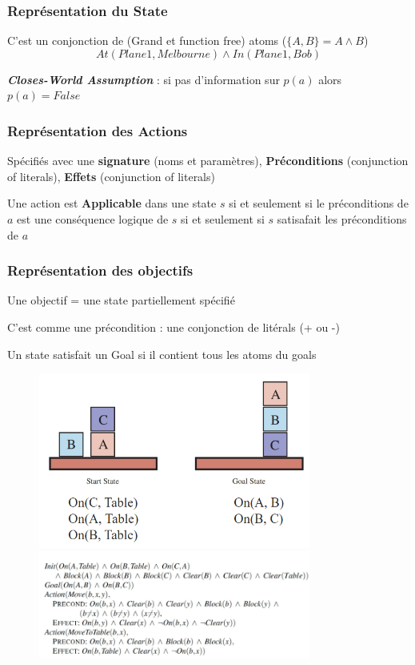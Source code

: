 \documentclass[12pt]{article}
\begin{document}
		\subsubsection{Représentation du State}
			C'est un conjonction de (Grand et function free) atoms ($\{A,B\} = A\land B$)
			\begin{equation}
				At(Plane1, Melbourne) \land In(Plane1, Bob)
			\end{equation}
			
			\textbf{\textit{Closes-World Assumption}} : si pas d'information sur $p(a)$ alors $p(a) = False$
			
		\subsubsection{Représentation des Actions}
			Spécifiés avec une \textbf{signature} (noms et paramètres), \textbf{Préconditions} (conjunction of literals), \textbf{Effets} (conjunction of literals)
			
			Une action est \textbf{Applicable} dans une state $s$ si et seulement si le préconditions de $a$ est une conséquence logique de $s$ si et seulement si $s$ satisafait les préconditions de $a$
			
		\subsubsection{Représentation des objectifs}
			Une objectif = une state partiellement spécifié
			
			C'est comme une précondition : une conjonction de litérals (+ ou -)
			
			Un state satisfait un Goal si il contient tous les atoms du goals
		
			
			\begin{figure}[htp]	
				\centering
				\includegraphics[width=0.8\textwidth]{img/BLOCK.png}
				\includegraphics[width=0.8\textwidth]{img/BLOCK1.png}
			\end{figure}
			 \newpage
			
\end{document}
